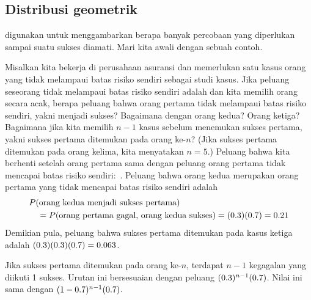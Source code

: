 

\D{\newpage}

\subsection{Distribusi geometrik}


 digunakan untuk
menggambarkan berapa banyak percobaan yang diperlukan sampai suatu sukses
diamati. Mari kita awali dengan sebuah contoh.

\begin{examplewrap}
\begin{nexample}{Misalkan kita bekerja di perusahaan asuransi dan
    memerlukan satu kasus orang yang tidak melampaui batas risiko sendiri
    sebagai studi kasus. Jika peluang seseorang tidak melampaui batas
    risiko sendiri adalah \insureSprob{} dan kita memilih orang secara acak,
    berapa peluang bahwa orang pertama tidak melampaui batas risiko sendiri,
    yakni menjadi sukses? Bagaimana dengan orang kedua? Orang ketiga?
    Bagaimana jika kita memilih $n - 1$ kasus sebelum menemukan sukses
    pertama, yakni sukses pertama ditemukan pada orang ke-$n$?
    (Jika sukses pertama ditemukan pada orang kelima, kita menyatakan
    $n=5$.)}
  \label{waitForDeductible}%
  Peluang bahwa kita berhenti setelah orang pertama sama dengan peluang
  orang pertama tidak mencapai batas risiko sendiri:~\insureSprob{}.
  Peluang bahwa orang kedua merupakan orang pertama yang tidak mencapai
  batas risiko sendiri adalah
  \begin{align*}
  &P(\text{orang kedua menjadi sukses pertama}) \\
  &\quad
    = P(\text{orang pertama gagal, orang kedua sukses})
    = (0.3{})(0.7{})
    = 0.21{}
  \end{align*}
  Demikian pula, peluang bahwa sukses pertama ditemukan pada kasus ketiga
  adalah $(0.3{})(0.3{})(0.7{})
    = 0.063$.

  Jika sukses pertama ditemukan pada orang ke-$n$, terdapat $n-1$
  kegagalan yang diikuti 1 sukses. Urutan ini bersesuaian dengan peluang
  $(0.3{})^{n-1}(0.7{})$.
  Nilai ini sama dengan
  $(1-0.7{})^{n-1}(0.7{})$.
\end{nexample}
\end{examplewrap}

